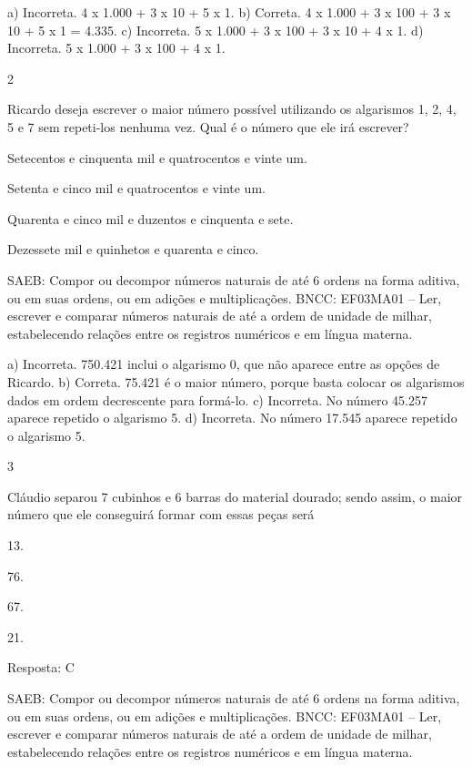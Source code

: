 \begin{multicols}{2}
\begin{enumerate}
{a) Incorreta. 4 x 1.000 + 3 x 10 + 5 x 1.
b) Correta. 4 x 1.000 + 3 x 100 + 3 x 10 + 5 x 1 = 4.335.
c) Incorreta. 5 x 1.000 + 3 x 100 + 3 x 10 + 4 x 1.
d) Incorreta. 5 x 1.000 + 3 x 100 + 4 x 1.

\num{2}

Ricardo deseja escrever o maior número possível utilizando os algarismos 1, 2, 4, 5 e 7 sem repeti-los nenhuma vez. Qual é o número que ele irá escrever?

\begin{escolha}
\item
  Setecentos e cinquenta mil e quatrocentos e vinte um.
\item
  Setenta e cinco mil e quatrocentos e vinte um.
\item
  Quarenta e cinco mil e duzentos e cinquenta e sete.
\item
  Dezessete mil e quinhetos e quarenta e cinco.
\end{escolha}

SAEB: Compor ou decompor números naturais de até 6 ordens na forma aditiva, ou em suas ordens, ou em adições e multiplicações.
BNCC: EF03MA01 -- Ler, escrever e comparar números naturais de até a ordem de unidade de milhar, estabelecendo relações entre os registros numéricos e em língua materna.

a) Incorreta. 750.421 inclui o algarismo 0, que não aparece entre as opções de Ricardo.
b) Correta. 75.421 é o maior número, porque basta colocar os algarismos dados em ordem decrescente para formá-lo.
c) Incorreta. No número 45.257 aparece repetido o algarismo 5. 
d) Incorreta. No número 17.545 aparece repetido o algarismo 5. 

\num{3}

Cláudio separou 7 cubinhos e 6 barras do material dourado; sendo assim, o maior número que ele conseguirá formar com essas peças será

\begin{escolha}
\item
  13.
\item
  76.
\item
  67.
\item
  21.
\end{escolha}

Resposta: C



SAEB: Compor ou decompor números naturais de até 6 ordens na forma aditiva, ou em suas ordens, ou em adições e multiplicações.
BNCC: EF03MA01 -- Ler, escrever e comparar números naturais de até a ordem de unidade de milhar, estabelecendo relações entre os registros numéricos e em língua materna.

}
\end{enumerate}
\end{multicols}
